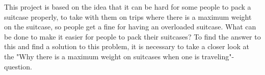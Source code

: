 This project is based on the idea that it can be hard for some people to pack a suitcase properly, to take with them on trips where there is a maximum weight on the suitcase, so people get a fine for having an overloaded suitcase. What can be done to make it easier for people to pack their suitcases? To find the answer to this and find a solution to this problem, it is necessary to take a closer look at the "Why there is a maximum weight on suitcases when one is traveling"-question.